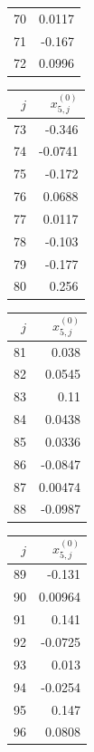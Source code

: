{\begin{tabular}[t]{r|r}
70 & 0.0117 \\
71 & -0.167 \\
72 & 0.0996
\end{tabular}\kern4pt
\begin{tabular}[t]{r|r}
$j$ & $x^{(0)}_{5,j}$ \\\hline
73 & -0.346 \\
74 & -0.0741 \\
75 & -0.172 \\
76 & 0.0688 \\
77 & 0.0117 \\
78 & -0.103 \\
79 & -0.177 \\
80 & 0.256
\end{tabular}\kern4pt
\begin{tabular}[t]{r|r}
$j$ & $x^{(0)}_{5,j}$ \\\hline
81 & 0.038 \\
82 & 0.0545 \\
83 & 0.11 \\
84 & 0.0438 \\
85 & 0.0336 \\
86 & -0.0847 \\
87 & 0.00474 \\
88 & -0.0987
\end{tabular}\kern4pt
\begin{tabular}[t]{r|r}
$j$ & $x^{(0)}_{5,j}$ \\\hline
89 & -0.131 \\
90 & 0.00964 \\
91 & 0.141 \\
92 & -0.0725 \\
93 & 0.013 \\
94 & -0.0254 \\
95 & 0.147 \\
96 & 0.0808
\end{tabular}}

